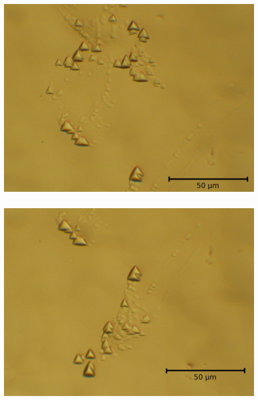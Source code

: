 \documentclass[german,  %
parskip=full,  %
]{scrartcl}
\begin{document}
\begin{minipage}{0.45\textwidth}\centering
\includegraphics[scale=0.08]{Si_3Sch_15s_2x25x_00018}
\end{minipage}
\begin{minipage}{0.1\textwidth}\centering
\[\]
\end{minipage}
\begin{minipage}{0.45\textwidth}\centering
\includegraphics[scale=0.08]{Si_3Sch_15s_2x25x_00019}
\end{minipage} \\\\
\end{document}
